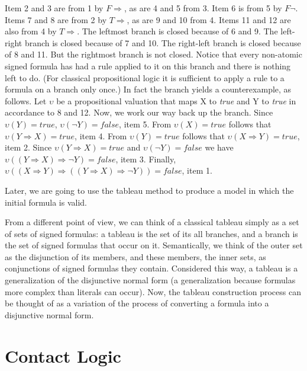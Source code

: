 \documentclass{article}
\begin{document}
	\par
	Item 2 and 3 are from 1 by $F \Rightarrow$, as are 4 and 5 from 3. Item 6 is from 5 by $F \neg$. Items 7 and 8 are from 2 by $T \Rightarrow$, as are 9 and 10 from 4. Items 11 and 12 are also from 4 by $T \Rightarrow$. The leftmost branch is closed because of 6 and 9. The left-right branch is closed because of 7 and 10. The right-left branch is closed because of 8 and 11. But the rightmost branch is not closed. Notice that every non-atomic signed formula has had a rule applied to it on this branch and there is nothing left to do. (For classical propositional logic it is sufficient to apply a rule to a formula on a branch only once.) In fact the branch yields a counterexample, as follows. Let $\upsilon$ be a propositional valuation that maps X to \textit{true} and Y to \textit{true} in accordance to 8 and 12. Now, we work our way back up the branch. Since $\upsilon(Y) = true$, $\upsilon(\neg Y) = false$, item 5. From $\upsilon(X) = true$ follows that $\upsilon(Y \Rightarrow X) = true$, item 4. From $\upsilon(Y) = true$ follows that $\upsilon(X \Rightarrow Y) = true$, item 2. Since $\upsilon(Y \Rightarrow X) = true$ and $\upsilon(\neg Y) = false$ we have $\upsilon((Y \Rightarrow X) \Rightarrow \neg Y) = false$, item 3. Finally, $\upsilon((X \Rightarrow Y) \Rightarrow ((Y \Rightarrow X) \Rightarrow \neg Y)) = false$, item 1.
	\par
	Later, we are going to use the tableau method to produce a model in which the initial formula is valid.
	\par
	From a different point of view, we can think of a classical tableau simply as a set of sets of signed formulas: a tableau is the set of its all branches, and a branch is the set of signed formulas that occur on it. Semantically, we think of the outer set as the disjunction of its members, and these members, the inner sets, as conjunctions of signed formulas they contain. Considered this way, a tableau is a generalization of the disjunctive normal form (a generalization because formulas more complex than literals can occur). Now, the tableau construction process can be thought of as a variation of the process of converting a formula into a disjunctive normal form.

	\newpage
	\section{Contact Logic}
\end{document}

